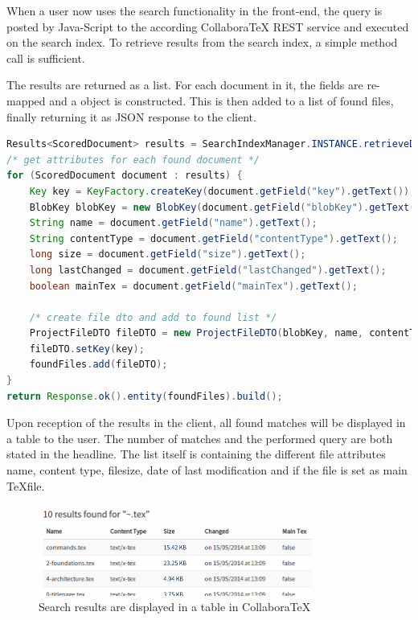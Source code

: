 When a user now uses the search functionality in the front-end, the query is posted by Java-Script to the according CollaboraTeX REST service and executed on the search index. To retrieve results from the search index, a simple method call is sufficient.

The results are returned as a list. For each document in it, the fields are re-mapped and a  object is constructed. This is then added to a list of found files, finally returning it as JSON response to the client.

\begin{lstlisting}[language=Java, caption=Retrieving Results from the Search Index for a Query]
Results<ScoredDocument> results = SearchIndexManager.INSTANCE.retrieveDocuments(query.trim());
/* get attributes for each found document */
for (ScoredDocument document : results) {
    Key key = KeyFactory.createKey(document.getField("key").getText());
    BlobKey blobKey = new BlobKey(document.getField("blobKey").getText());
    String name = document.getField("name").getText();
    String contentType = document.getField("contentType").getText();
    long size = document.getField("size").getText();
    long lastChanged = document.getField("lastChanged").getText();
    boolean mainTex = document.getField("mainTex").getText();

    /* create file dto and add to found list */
    ProjectFileDTO fileDTO = new ProjectFileDTO(blobKey, name, contentType, size, lastChanged, mainTex);
    fileDTO.setKey(key);
    foundFiles.add(fileDTO);
}
return Response.ok().entity(foundFiles).build();
\end{lstlisting}

Upon reception of the results in the client, all found matches will be displayed in a table to the user. The number of matches and the performed query are both stated in the headline. The list itself is containing the different file attributes name, content type, filesize, date of last modification and if the file is set as main \TeX file.

\begin{figure}[H]
	\centering
		\includegraphics[width=0.8\textwidth]{images/screenshot-search.png}
	\caption{Search results are displayed in a table in CollaboraTeX}
\end{figure}

